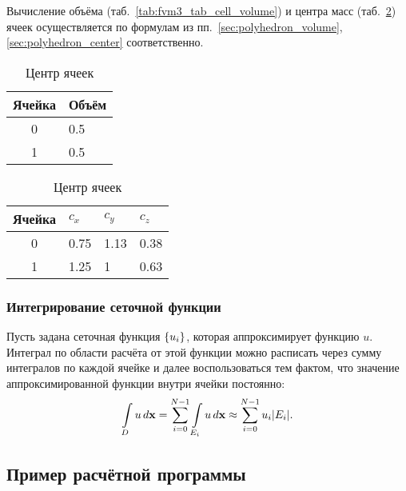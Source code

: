 Вычисление объёма (таб.~\ref{tab:fvm3_tab_cell_volume}) и
центра масс (таб.~\ref{tab:fvm3_tab_cell_center}) ячеек
осуществляется по формулам из пп.~\ref{sec:polyhedron_volume}, \ref{sec:polyhedron_center}
соответственно.

\begin{table}[H]
\centering
    \begin{minipage}[t]{.4\linewidth}
      \centering
      \begin{tabular}[t]{c|l}
      Ячейка & Объём\\
      \hline
      0 &  0.5  \\
      1 &  0.5  \\
      \end{tabular}
      \caption{\label{tab:fvm3_tab_cell_volume} Объём ячеек}
    \end{minipage}
    \qquad
    \begin{minipage}[t]{.4\linewidth}
        \centering
        \begin{tabular}[t]{c|l|l|l}
        Ячейка & $c_x$ & $c_y$ & $c_z$ \\
        \hline
        0 &  0.75   &  1.13 & 0.38 \\
        1 &  1.25   &  1    & 0.63 \\
        \end{tabular}
        \caption{\label{tab:fvm3_tab_cell_center} Центр ячеек}
    \end{minipage}
\end{table}


\subsubsection{Интегрирование сеточной функции}
Пусть задана сеточная функция $\left\{u_i\right\}$, которая аппроксимирует функцию $u$.
Интеграл по области расчёта от этой функции можно расписать через сумму интегралов
по каждой ячейке и далее воспользоваться тем фактом,
что значение аппроксимированной функции внутри ячейки постоянно:
\begin{equation}
\label{eq:fvm_integrate}
\arint{u}{D}{\vec x} = \sum_{i=0}^{N-1} \arint{u}{E_i}{\vec x} \approx \sum_{i=0}^{N-1} u_i |E_i|.
\end{equation}


\subsection{Пример расчётной программы}
\label{sec:prog-poisson2-fvm}

